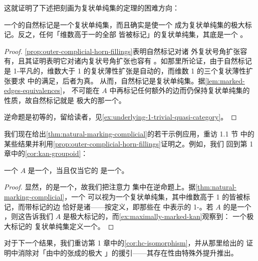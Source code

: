 这就证明了下述把\trQuasiCategory{}刻画为复状单纯集的定理的困难方向：

\begin{theorem}\label{thm:natural-marking-complicial}
一个\trQuasiCategory{}的自然标记是一个复状单纯集，而且确实是使一个%
\trQuasiCategory{}成为复状单纯集的极大标记。反之，任何「维数高于一的全部%
\trSimplex{}皆被标记」的复状单纯集，其底\trSimplicialSet{}是一个%
\trQuasiCategory。
\end{theorem}

\begin{proof}
\cref{prop:outer-complicial-horn-fillings}表明自然标记\trQuasiCategory{}对诸
外复状号角扩张容有\trFiller，且其证明表明它对诸内复状号角扩张也容有%
\trFiller。如那里所论证，由于自然标记\trQuasiCategory{}是 1-平凡的，维数大于
1 的复状薄性扩张是自动的，而维数 1 的三个复状薄性扩张要求\trQuasiCategory{}%
中的\trIsomorphism{}满足\trTwoOfThreeProperty，后者为真。
从而，自然标记\trQuasiCategory{}是复状单纯集。据\cref{lem:marked-edges-equivalences}，
不可能在 $A$ 中再标记任何额外的边而仍保持复状单纯集的性质，故自然标记就是
极大的那一个。

逆命题是初等的，留给读者，见\cref{ex:underlying-1-trivial-quasi-category}。
\end{proof}

我们现在给出\cref{thm:natural-marking-complicial}的若干示例应用，重访 1.1 节
中的某些结果并利用\cref{prop:outer-complicial-horn-fillings}证明之。例如，我们
回到第 1 章中的\cref{cor:kan-groupoid}：

\begin{corollary}\label{cor:kan-complex-groupoid}
一个\trQuasiCategory{} $A$ 是一个\trKanComplex{}，当且仅当它的%
\trHomotopyCategory{}是一个\trGroupoid。
\end{corollary}

\begin{proof}
显然，\trKanComplex{}的\trHomotopyCategory{}是一个\trGroupoid，故我们把注意力
集中在逆命题上。据\cref{thm:natural-marking-complicial}，一个\trQuasiCategory{}%
可以视为一个复状单纯集，其中维数高于 1 的\trSimplex{}皆被标记，而带标记的边
恰好是诸\trIsomorphism——按定义，\trIsomorphism{}即那些在\trHomotopyCategory{}%
中表示\trIsomorphism{}的 1-\trSimplex。若 $A$ 的\trHomotopyCategory{}是一个%
\trGroupoid，则这告诉我们 $A$ 是极大标记的，而\cref{ex:maximally-marked-kan}观察到：
一个极大标记的
复状单纯集定义一个\trKanComplex。
\end{proof}

对于下一个结果，我们重访第 1 章中的\cref{cor:hc-isomorphism}，并从那里给出的
证明中消除对「由\trQuasiCategory{}中的\trIsomorphism{}张成的极大%
\trKanComplex」的援引——其存在性由特殊外\trHorn{}提升推出。

